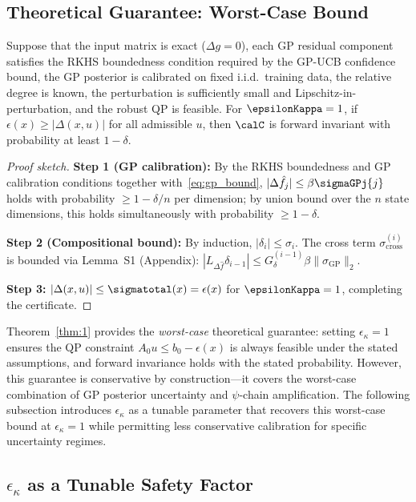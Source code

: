 \subsection{Theoretical Guarantee: Worst-Case Bound}

\begin{theorem}
\label{thm:1}
Suppose that the input matrix is exact ($\Delta g = 0$), each GP residual component satisfies the RKHS boundedness condition required by the GP-UCB confidence bound, the GP posterior is calibrated on fixed i.i.d.\ training data, the relative degree is known, the perturbation is sufficiently small and Lipschitz-in-perturbation, and the robust QP is feasible. For $\epsilonKappa = 1$, if $\epsilon(x) \geq |\Delta(x,u)|$ for all admissible $u$, then $\calC$ is forward invariant with probability at least $1-\delta$.
\end{theorem}

\begin{proof}[Proof sketch]
\textbf{Step 1 (GP calibration):} By the RKHS boundedness and GP calibration conditions together with~\eqref{eq:gp_bound}, $|\Delta\hat{f}_j| \leq \beta\sigmaGPj{j}$ holds with probability $\geq 1-\delta/n$ per dimension; by union bound over the $n$ state dimensions, this holds simultaneously with probability $\geq 1-\delta$.

\textbf{Step 2 (Compositional bound):} By induction, $|\delta_i| \leq \sigma_i$. The cross term $\sigma_{\mathrm{cross}}^{(i)}$ is bounded via Lemma~S1 (Appendix): $|L_{\Delta\hat{f}}\delta_{i-1}| \leq G_\delta^{(i-1)} \beta\|\sigma_{\mathrm{GP}}\|_2$.

\textbf{Step 3:} $|\Delta(x,u)| \leq \sigmatotal(x) = \epsilon(x)$ for $\epsilonKappa=1$, completing the certificate.
\end{proof}

Theorem~\ref{thm:1} provides the \emph{worst-case} theoretical guarantee: setting $\epsilon_\kappa=1$ ensures the QP constraint $A_0u \leq b_0 - \epsilon(x)$ is always feasible under the stated assumptions, and forward invariance holds with the stated probability. However, this guarantee is conservative by construction---it covers the worst-case combination of GP posterior uncertainty and $\psi$-chain amplification. The following subsection introduces $\epsilon_\kappa$ as a tunable parameter that recovers this worst-case bound at $\epsilon_\kappa=1$ while permitting less conservative calibration for specific uncertainty regimes.

\subsection{$\epsilon_\kappa$ as a Tunable Safety Factor}

